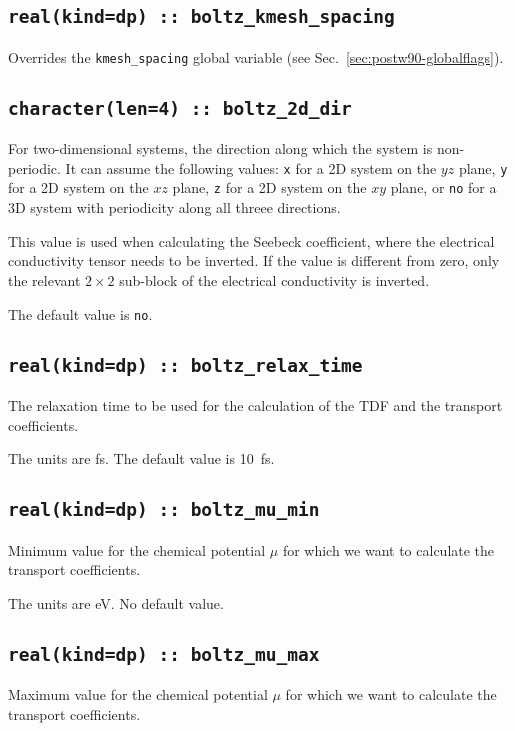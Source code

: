 \subsection[boltz\_kmesh\_spacing]{\tt real(kind=dp) :: boltz\_kmesh\_spacing}
Overrides the \verb#kmesh_spacing# global variable (see
Sec.~\ref{sec:postw90-globalflags}).

\subsection[boltz\_2d\_dir]{\tt  character(len=4) :: boltz\_2d\_dir}
\label{sec:boltz2ddir}
For two-dimensional systems, the direction along which the system is non-periodic. It can assume the following values: \texttt{x} for a 2D system on the $yz$ plane,  \texttt{y} for a 2D system on the $xz$ plane, \texttt{z} for a 2D system on the $xy$ plane, or \texttt{no} for a 3D system with periodicity along all threee directions.

This value is used when calculating the Seebeck coefficient, where the electrical conductivity tensor needs to be inverted. If the value is different from zero, only the relevant $2\times 2$ sub-block of the electrical conductivity is inverted.

The default value is \texttt{no}.

\subsection[boltz\_relax\_time]{\tt real(kind=dp) :: boltz\_relax\_time}
The relaxation time to be used for the calculation of the TDF and the transport coefficients.

The units are fs.
The default value is 10~fs.

\subsection[boltz\_mu\_min]{\tt real(kind=dp) :: boltz\_mu\_min}
Minimum value for the chemical potential $\mu$ for which we want to calculate the transport coefficients.

The units are eV.
No default value.

\subsection[boltz\_mu\_max]{\tt real(kind=dp) :: boltz\_mu\_max}
Maximum value for the chemical potential $\mu$ for which we want to calculate the transport coefficients.

